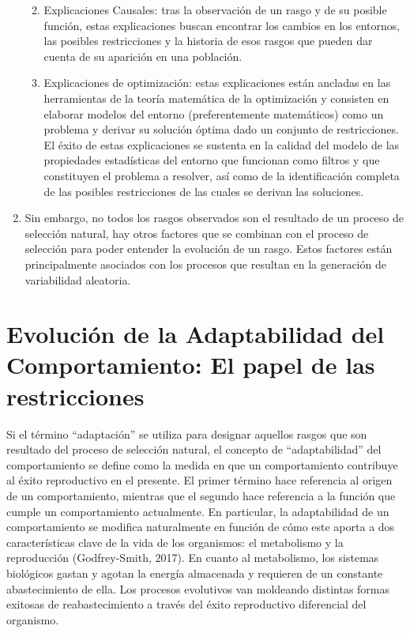 \documentclass[
  a4paper,
  DIV=11,
  numbers=noendperiod]{scrreprt}
\begin{document}
\begin{enumerate}
  \begin{enumerate}
  \def\labelenumii{\alph{enumii}.}
  \item
    Explicaciones Causales: tras la observación de un rasgo y de su
    posible función, estas explicaciones buscan encontrar los cambios en
    los entornos, las posibles restricciones y la historia de esos
    rasgos que pueden dar cuenta de su aparición en una población.
  \item
    Explicaciones de optimización: estas explicaciones están ancladas en
    las herramientas de la teoría matemática de la optimización y
    consisten en elaborar modelos del entorno (preferentemente
    matemáticos) como un problema y derivar su solución óptima dado un
    conjunto de restricciones. El éxito de estas explicaciones se
    sustenta en la calidad del modelo de las propiedades estadísticas
    del entorno que funcionan como filtros y que constituyen el problema
    a resolver, así como de la identificación completa de las posibles
    restricciones de las cuales se derivan las soluciones.
  \end{enumerate}
\item
  Sin embargo, no todos los rasgos observados son el resultado de un
  proceso de selección natural, hay otros factores que se combinan con
  el proceso de selección para poder entender la evolución de un rasgo.
  Estos factores están principalmente asociados con los procesos que
  resultan en la generación de variabilidad aleatoria.
\end{enumerate}


\chapter{Evolución de la Adaptabilidad del Comportamiento: El papel de
las
restricciones}\label{evoluciuxf3n-de-la-adaptabilidad-del-comportamiento-el-papel-de-las-restricciones}

Si el término ``adaptación'' se utiliza para designar aquellos rasgos
que son resultado del proceso de selección natural, el concepto de
``adaptabilidad'' del comportamiento se define como la medida en que un
comportamiento contribuye al éxito reproductivo en el presente. El
primer término hace referencia al origen de un comportamiento, mientras
que el segundo hace referencia a la función que cumple un comportamiento
actualmente. En particular, la adaptabilidad de un comportamiento se
modifica naturalmente en función de cómo este aporta a dos
características clave de la vida de los organismos: el metabolismo y la
reproducción (Godfrey-Smith, 2017). En cuanto al metabolismo, los
sistemas biológicos gastan y agotan la energía almacenada y requieren de
un constante abastecimiento de ella. Los procesos evolutivos van
moldeando distintas formas exitosas de reabastecimiento a través del
éxito reproductivo diferencial del organismo.
\end{document}
